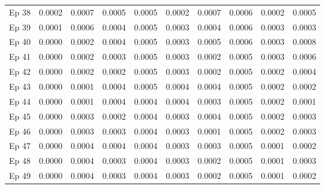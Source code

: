 \begin{table}[htbp]
\begin{tabular}{|l|l|l|l|l|l|l|l|l|l|}
Ep 38 & 0.0002 & 0.0007 & 0.0005 & 0.0005 & 0.0002 & 0.0007 & 0.0006 & 0.0002 & 0.0005  \\
Ep 39 & 0.0001 & 0.0006 & 0.0004 & 0.0005 & 0.0003 & 0.0004 & 0.0006 & 0.0003 & 0.0003  \\
Ep 40 & 0.0000 & 0.0002 & 0.0004 & 0.0005 & 0.0003 & 0.0005 & 0.0006 & 0.0003 & 0.0008  \\
Ep 41 & 0.0000 & 0.0002 & 0.0003 & 0.0005 & 0.0003 & 0.0002 & 0.0005 & 0.0003 & 0.0006  \\
Ep 42 & 0.0000 & 0.0002 & 0.0002 & 0.0005 & 0.0003 & 0.0002 & 0.0005 & 0.0002 & 0.0004  \\
Ep 43 & 0.0000 & 0.0001 & 0.0004 & 0.0005 & 0.0004 & 0.0004 & 0.0005 & 0.0002 & 0.0002  \\
Ep 44 & 0.0000 & 0.0001 & 0.0004 & 0.0004 & 0.0004 & 0.0003 & 0.0005 & 0.0002 & 0.0001  \\
Ep 45 & 0.0000 & 0.0003 & 0.0002 & 0.0004 & 0.0003 & 0.0004 & 0.0005 & 0.0002 & 0.0003  \\
Ep 46 & 0.0000 & 0.0003 & 0.0003 & 0.0004 & 0.0003 & 0.0001 & 0.0005 & 0.0002 & 0.0003  \\
Ep 47 & 0.0000 & 0.0004 & 0.0004 & 0.0004 & 0.0003 & 0.0003 & 0.0005 & 0.0001 & 0.0002  \\
Ep 48 & 0.0000 & 0.0004 & 0.0003 & 0.0004 & 0.0003 & 0.0002 & 0.0005 & 0.0001 & 0.0003  \\
Ep 49 & 0.0000 & 0.0004 & 0.0003 & 0.0004 & 0.0003 & 0.0002 & 0.0005 & 0.0001 & 0.0002  \\
\hline
\end{tabular}
\end{table}